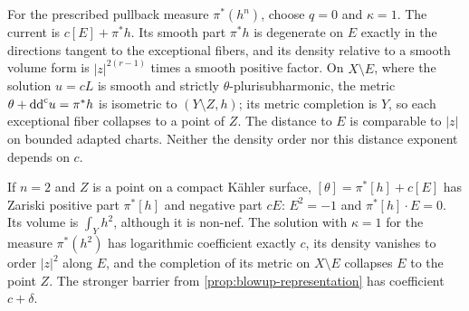 For the prescribed pullback measure $\pi^*(h^n)$, choose $q=0$ and $\kappa=1$. The current is $c[E]+\pi^*h$. Its smooth part $\pi^*h$ is degenerate on $E$ exactly in the directions tangent to the exceptional fibers, and its density relative to a smooth volume form is $|z|^{2(r-1)}$ times a smooth positive factor. On $X\setminus E$, where the solution $u=cL$ is smooth and strictly $\theta$-plurisubharmonic, the metric $\theta+\mathrm{dd}^{\mathrm{c}} u=\pi^*h$ is isometric to $(Y\setminus Z,h)$; its metric completion is $Y$, so each exceptional fiber collapses to a point of $Z$. The distance to $E$ is comparable to $|z|$ on bounded adapted charts. Neither the density order nor this distance exponent depends on $c$.

\begin{example}\label{ex:surface-blowup}
If $n=2$ and $Z$ is a point on a compact K\"ahler surface, $[\theta]=\pi^*[h]+c[E]$ has Zariski positive part $\pi^*[h]$ and negative part $cE$: $E^2=-1$ and $\pi^*[h]\cdot E=0$. Its volume is $\int_Yh^2$, although it is non-nef. The solution with $\kappa=1$ for the measure $\pi^*(h^2)$ has logarithmic coefficient exactly $c$, its density vanishes to order $|z|^2$ along $E$, and the completion of its metric on $X\setminus E$ collapses $E$ to the point $Z$. The stronger barrier from \cref{prop:blowup-representation} has coefficient $c+\delta$.
\end{example}

